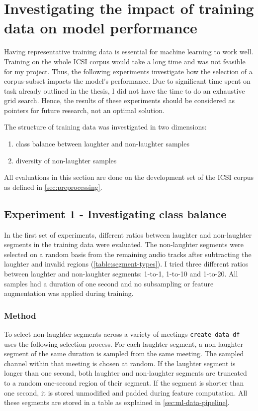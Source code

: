 \documentclass[bsc,frontabs,parskip,deptreport]{infthesis}
\begin{document}
\chapter{Investigating the impact of training data on model performance} \label{cha:experiments}
Having representative training data is essential for machine learning to work well. Training on the whole ICSI corpus would take a long time and was not feasible for my project.
Thus, the following experiments investigate how the selection of a corpus-subset impacts the model's performance. 
Due to significant time spent on task already outlined in the thesis, I did not have the time to do an exhaustive grid search. Hence, the results of these experiments should be considered as pointers for future research, not an optimal solution.

The structure of training data was investigated in two dimensions: 
\begin{enumerate}
    \item class balance between laughter and non-laughter samples
    \item diversity of non-laughter samples 
\end{enumerate}

All evaluations in this section are done on the development set of the ICSI corpus as defined in \autoref{sec:preprocessing}.

\section{Experiment 1 - Investigating class balance} \label{sec:exp-1}
In the first set of experiments, different ratios between laughter and non-laughter segments in the training data were evaluated. 
The non-laughter segments were selected on a random basis from the remaining audio tracks after subtracting the laughter and invalid regions (\autoref{table:segment-types}). 
I tried three different ratios between laughter and non-laughter segments: 1-to-1, 1-to-10 and 1-to-20.
All samples had a duration of one second and no subsampling or feature augmentation was applied during training.

\subsection{Method}
To select non-laughter segments across a variety of meetings \verb|create_data_df| uses the following selection process.
For each laughter segment, a non-laughter segment of the same duration is sampled from the same meeting. The sampled channel within that meeting is chosen at random.
If the laughter segment is longer than one second, both laughter and non-laughter segments are truncated to a random one-second region of their segment. 
If the segment is shorter than one second, it is stored unmodified and padded during feature computation.
All these segments are stored in a table as explained in \autoref{sec:ml-data-pipeline}.
\end{document}
